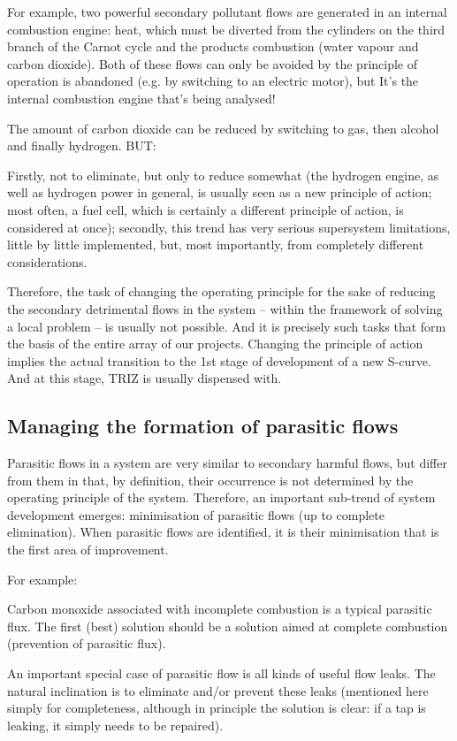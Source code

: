 \documentclass[a4paper,11pt]{article}
\begin{document}
For example, two powerful secondary pollutant flows are generated in an
internal combustion engine: heat, which must be diverted from the cylinders on
the third branch of the Carnot cycle and the products combustion (water vapour
and carbon dioxide). Both of these flows can only be avoided by the principle
of operation is abandoned (e.g. by switching to an electric motor), but It's
the internal combustion engine that's being analysed!

The amount of carbon dioxide can be reduced by switching to gas, then alcohol
and finally hydrogen. BUT:

Firstly, not to eliminate, but only to reduce somewhat (the hydrogen engine,
as well as hydrogen power in general, is usually seen as a new principle of
action; most often, a fuel cell, which is certainly a different principle of
action, is considered at once); secondly, this trend has very serious
supersystem limitations, little by little implemented, but, most importantly,
from completely different considerations.

Therefore, the task of changing the operating principle for the sake of
reducing the secondary detrimental flows in the system -- within the framework
of solving a local problem -- is usually not possible. And it is precisely
such tasks that form the basis of the entire array of our projects. Changing
the principle of action implies the actual transition to the 1st stage of
development of a new S-curve. And at this stage, TRIZ is usually dispensed
with.

\subsection{Managing the formation of parasitic flows}

Parasitic flows in a system are very similar to secondary harmful flows, but
differ from them in that, by definition, their occurrence is not determined by
the operating principle of the system. Therefore, an important sub-trend of
system development emerges: minimisation of parasitic flows (up to complete
elimination). When parasitic flows are identified, it is their minimisation
that is the first area of improvement.

For example:

Carbon monoxide associated with incomplete combustion is a typical parasitic
flux. The first (best) solution should be a solution aimed at complete
combustion (prevention of parasitic flux).

An important special case of parasitic flow is all kinds of useful flow
leaks. The natural inclination is to eliminate and/or prevent these leaks
(mentioned here simply for completeness, although in principle the solution is
clear: if a tap is leaking, it simply needs to be repaired).
\end{document}
